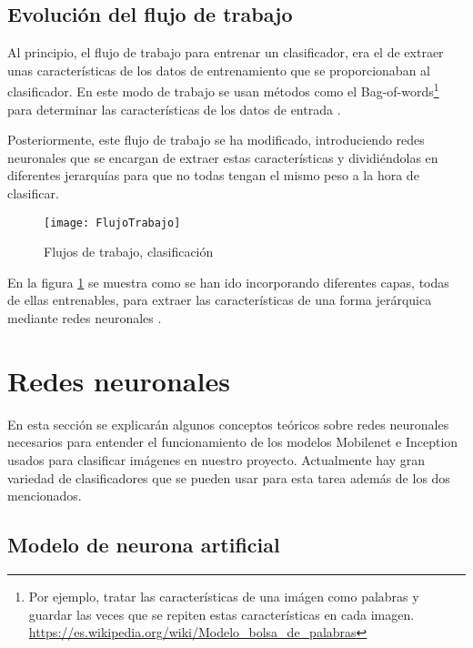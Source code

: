 \subsection{Evolución del flujo de trabajo}

Al principio, el flujo de trabajo para entrenar un clasificador, era el de extraer unas características de los datos de entrenamiento que se proporcionaban al clasificador. En este modo de trabajo se usan métodos como el Bag-of-words\footnote{Por ejemplo, tratar las características de una imágen como palabras y guardar las veces que se repiten estas características en cada imagen. \url{https://es.wikipedia.org/wiki/Modelo_bolsa_de_palabras}} para determinar las características de los datos de entrada \cite{iberosetas}.

Posteriormente, este flujo de trabajo se ha modificado, introduciendo redes neuronales que se encargan de extraer estas características y dividiéndolas en diferentes jerarquías para que no todas tengan el mismo peso a la hora de clasificar.

\begin{figure}[h]
    \begin{center}%
        \begin{center}%
          \texttt{[image: FlujoTrabajo]}%
          \caption{Flujos de trabajo, clasificación}%
          \label{figFlujo}%
        \end{center}%
  	\end{center}%
\end{figure}%

En la figura \ref{figFlujo} se muestra como se han ido incorporando diferentes capas, todas de ellas entrenables, para extraer las características de una forma jerárquica mediante redes neuronales  \cite{flujosTrabajo}.

\newpage

\section{Redes neuronales}

En esta sección se explicarán algunos conceptos teóricos sobre redes neuronales necesarios para entender el funcionamiento de los modelos Mobilenet e Inception usados para clasificar imágenes en nuestro proyecto. Actualmente hay gran variedad de clasificadores que se pueden usar para esta tarea además de los dos mencionados.

\subsection{Modelo de neurona artificial}

